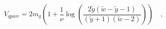\begin{equation}
V_{qpair} = 2 m_q\left(1 +
\frac{1}{\nu}\log\left(\frac{2\tilde{y}(\tilde{w}-\tilde{y}-1)}{(\tilde{y}+1)(\tilde{w}-2)}\right)\right)\quad,
\end{equation}

